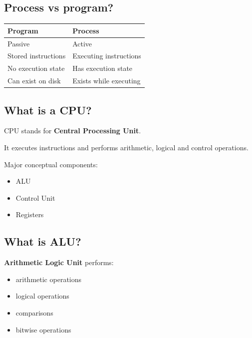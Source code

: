 \subsection{Process vs program?}

\begin{center}
\setlength{\tabcolsep}{6pt}
\renewcommand{\arraystretch}{1.2}
\begin{tabular}{|l|l|}
\hline
\textbf{Program} & \textbf{Process} \\
\hline
Passive & Active \\
Stored instructions & Executing instructions \\
No execution state & Has execution state \\
Can exist on disk & Exists while executing \\
\hline
\end{tabular}
\end{center}

\medskip

\subsection{What is a CPU?}

CPU stands for \textbf{Central Processing Unit}.

It executes instructions and performs arithmetic, logical and control operations.

Major conceptual components:

\begin{itemize}
  \item ALU
  \item Control Unit
  \item Registers
\end{itemize}

\medskip

\subsection{What is ALU?}

\textbf{Arithmetic Logic Unit} performs:

\begin{itemize}
  \item arithmetic operations
  \item logical operations
  \item comparisons
  \item bitwise operations
\end{itemize}

